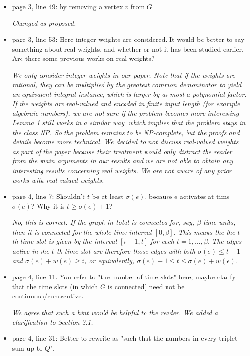 \documentclass[11pt,a4paper]{article}
\begin{document}
\begin{itemize}
\item page 3, line 49: by removing a vertex $v$ from $G$

\textit{Changed as proposed.}

\item page 3, line 53: Here integer weights are considered. It would be better to say something about real weights, and whether or not it has been studied earlier. Are there some previous works on real weights?

\textit{We only consider integer weights in our paper. Note that if the weights are rational, they can be multiplied by the greatest common demoninator to yield an equivalent integral instance, which is larger by at most a polynomial factor. 
If the weights are real-valued and encoded in finite input length (for example algebraic numbers), we are not sure if the problem becomes more interesting -- Lemma 1 still works in a similar way, which implies that the problem stays in the class NP. So the problem remains to be NP-complete, but the proofs and details become more technical. 
We decided to not discuss real-valued weights as part of the paper because their treatment would only distract the reader from 
the main arguments in our results and we are not able to obtain any interesting results concerning real weights.
We are not aware of any prior works with real-valued weights.}

\item page 4, line 7: Shouldn't $t$ be at least $\sigma(e)$, because $e$ activates at time $\sigma(e)$? Why it is $t \geq \sigma(e)+1$?

\textit{No, this is correct. If the graph in total is connected for, say, $\beta$ time units, then it is connected for the whole time interval $[0, \beta]$. This means the the $t$-th time slot is given by the interval $[t-1,t]$ for each $t=1,\dots,\beta$. The edges active in the $t$-th time slot are therefore those edges with both $\sigma(e) \leq t-1$ and $\sigma(e) + w(e) \geq t$, or equivalently, $\sigma(e) + 1 \leq t \leq \sigma(e) + w(e)$.}

\item page 4, line 11: You refer to "the number of time slots" here; maybe clarify that the time slots (in which $G$ is connected) need not be continuous/consecutive.

\textit{We agree that such a hint would be helpful to the reader. We added a clarification to Section 2.1.}

\item page 4, line 31: Better to rewrite as "such that the numbers in every triplet sum up to $Q$".


\end{itemize}
\end{document}
